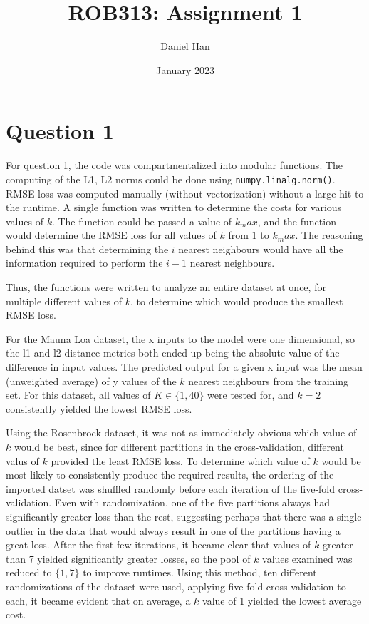 \documentclass{article}
\title{ROB313: Assignment 1}
\author{Daniel Han}
\date{January 2023}
\begin{document}
\maketitle

\section{Question 1}
For question 1, the code was compartmentalized into modular functions. The computing of the L1, L2 norms could be done using \texttt{numpy.linalg.norm()}. RMSE loss was computed manually (without vectorization) without a large hit to the runtime. A single function was written to determine the costs for various values of $k$. The function could be passed a value of $k_max$, and the function would determine the RMSE loss for all values of $k$ from $1$ to $k_max$. The reasoning behind this was that determining the $i$ nearest neighbours would have all the information required to perform the $i-1$ nearest neighbours.

Thus, the functions were written to analyze an entire dataset at once, for multiple different values of $k$, to determine which would produce the smallest RMSE loss.

For the Mauna Loa dataset, the x inputs to the model were one dimensional, so the l1 and l2 distance metrics both ended up being the absolute value of the difference in input values. The predicted output for a given x input was the mean (unweighted average) of y values of the $k$ nearest neighbours from the training set. For this dataset, all values of $K \in \{1, 40\}$ were tested for, and $k=2$ consistently yielded the lowest RMSE loss.

Using the Rosenbrock dataset, it was not as immediately obvious which value of $k$ would be best, since for different partitions in the cross-validation, different valus of $k$ provided the least RMSE loss. To determine which value of $k$ would be most likely to consistently produce the required results, the ordering of the imported datset was shuffled randomly before each iteration of the five-fold cross-validation. Even with randomization, one of the five partitions always had significantly greater loss than the rest, suggesting perhaps that there was a single outlier in the data that would always result in one of the partitions having a great loss. After the first few iterations, it became clear that values of $k$ greater than 7 yielded significantly greater losses, so the pool of $k$ values examined was reduced to $\{1,7\}$ to improve runtimes. Using this method, ten different randomizations of the dataset were used, applying five-fold cross-validation to each, it became evident that on average, a $k$ value of 1 yielded the lowest average cost.
\end{document}
